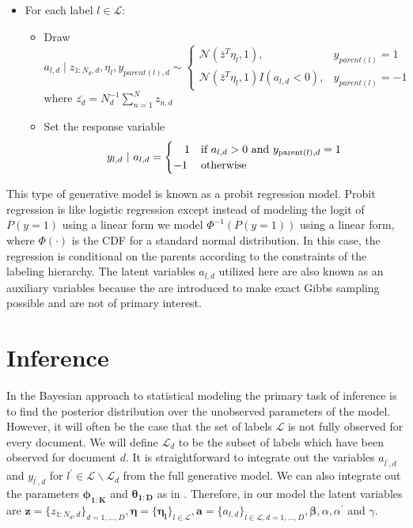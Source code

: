 \documentclass{article}
\begin{document}
\begin{enumerate}
\begin{itemize}
		\item For each label $l \in \mathcal{L}$:
		\begin{itemize}
			\item Draw $a_{l,d}\mid z_{1:N_{d},d},\eta_{l},y_{parent(l),d}\sim\begin{cases}
				\mathcal{N}\left(\bar{z}^{T}\eta_{l},1\right), & y_{parent(l)}=1\\
				\mathcal{N}\left(\bar{z}^{T}\eta_{l},1\right)I\left(a_{l,d}<0\right), & y_{parent(l)}=-1\end{cases}$ where $\bar{z_{d}}=N_{d}^{-1}\sum_{n=1}^{N}z_{n,d}$ 
			\item Set the response variable \begin{equation*} y_{l, d} \ | \ a_{l, d} = \begin{cases}
																										 \ \ \ 1 & \text{if $a_{l,d} > 0$ and $y_{{\rm parent}(l),d} = 1$} \\
																										-1 & \text{otherwise}
																								\end{cases}  
															 \end{equation*}															 
		\end{itemize}
	\end{itemize}
\end{enumerate}
%
This type of generative model is known as a probit regression model. Probit regression is like logistic regression except instead of modeling the logit of $P(y = 1)$ using a linear form we model $\Phi^{-1}(P(y = 1))$ using a linear form, where $\Phi(\cdot)$ is the CDF for a standard normal distribution.  In this case, the regression is conditional on the parents according to the constraints of the labeling hierarchy. The latent variables $a_{l,d}$ utilized here are also known as an auxiliary variables because the are introduced to make exact Gibbs sampling possible and are not of primary interest.  
%
\section{Inference}
\label{sec:inference}
%
In the Bayesian approach to statistical modeling the primary task of inference is to find the posterior distribution over the unobserved parameters of the model. However, it will often be the case that the set of labels $\mathcal{L}$ is not fully observed for every document.  We will define $\mathcal{L}_d$ to be the subset of labels which have been observed for document $d$.  It is straightforward to integrate out the variables $a_{l^\prime,d}$ and $y_{l^\prime,d}$ for $l^\prime \in \mathcal{L} \backslash \mathcal{L}_d$ from the full generative model.  We can also integrate out the parameters $\mathbf{\phi_{1:K}}$ and $\mathbf{\theta_{1:D}}$ as in \citet{Griffiths04}.  Therefore, in our model the latent variables are $\mathbf{z} = \{ z_{1:N_d,d} \}_{d = 1, \ldots, D},\mathbf{\eta} = \{ \mathbf{\eta_l} \}_{l \in \mathcal{L}},\mathbf{a} = \{ a_{l,d}\}_{l \in \mathcal{L}, d = 1, \ldots, D}, \mathbf{\beta}, \alpha, \alpha^{\prime}$ and $\gamma$.  
\end{document}

